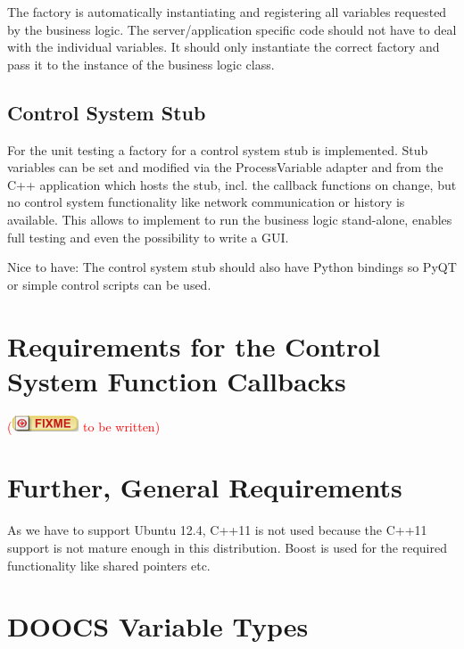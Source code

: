 \documentclass[11pt,a4paper]{scrartcl}
\newcounter{nFixmes}
\newcommand{\fixme}[1]{\addtocounter{nFixmes}{1}\textcolor{red}{(\includegraphics[height=2ex]{fixme} #1)}\xspace}
\begin{document}
The factory is automatically instantiating and registering all variables
requested by the business logic. The server/application specific code should
not have to deal with the individual variables. It should only instantiate the
correct factory and pass it to the instance of the business logic class.

\subsection{Control System Stub}
For the unit testing a factory for a control system stub is implemented.
Stub variables can be set and modified via the ProcessVariable adapter and from
the C++ application which hosts the stub, incl. the callback functions on
change, but no control system functionality like network communication or
history is available. This allows to implement to run the business logic
stand-alone, enables full testing and even the possibility to write a GUI.

Nice to have: The control system stub should also have Python bindings so PyQT
or simple control scripts can be used.

\section{Requirements for the Control System Function Callbacks}
\label{section_function_callbacks}
\fixme{to be written}

\section{Further, General Requirements}
As we have to support Ubuntu 12.4, C++11 is not used because the C++11 support
is not mature enough in this distribution. Boost is used for the required
functionality like shared pointers etc.

\appendix
\section{DOOCS Variable Types}
\end{document}
